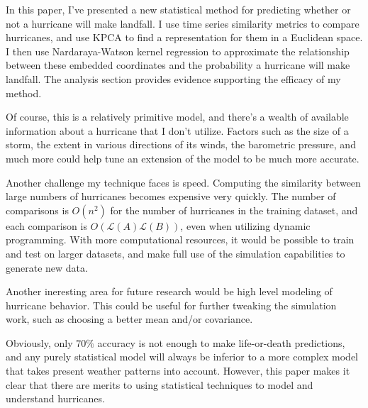 



\par
In this paper, I've presented a new statistical method for predicting whether or not a hurricane will make landfall.
I use time series similarity metrics to compare hurricanes, and use KPCA to find a representation for them in a Euclidean space.
I then use Nardaraya-Watson kernel regression to approximate the relationship between these embedded coordinates and the probability a hurricane will make landfall.
The analysis section provides evidence supporting the efficacy of my method.

\par
Of course, this is a relatively primitive model, and there's a wealth of available information about a hurricane that I don't utilize.
Factors such as the size of a storm, the extent in various directions of its winds, the barometric pressure, and much more could help tune an extension of the model to be much more accurate.

\par
Another challenge my technique faces is speed.
Computing the similarity between large numbers of hurricanes becomes expensive very quickly.
The number of comparisons is $O(n^{2})$ for the number of hurricanes in the training dataset, and each comparison is $O(\mathscr{L}(A)\mathscr{L}(B))$, even when utilizing dynamic programming.
With more computational resources, it would be possible to train and test on larger datasets, and make full use of the simulation capabilities to generate new data.

\par
Another ineresting area for future research would be high level modeling of hurricane behavior.
This could be useful for further tweaking the simulation work, such as choosing a better mean and/or covariance.

\par
Obviously, only $70\%$ accuracy is not enough to make life-or-death predictions, and any purely statistical model will always be inferior to a more complex model that takes present weather patterns into account.
However, this paper makes it clear that there are merits to using statistical techniques to model and understand hurricanes.